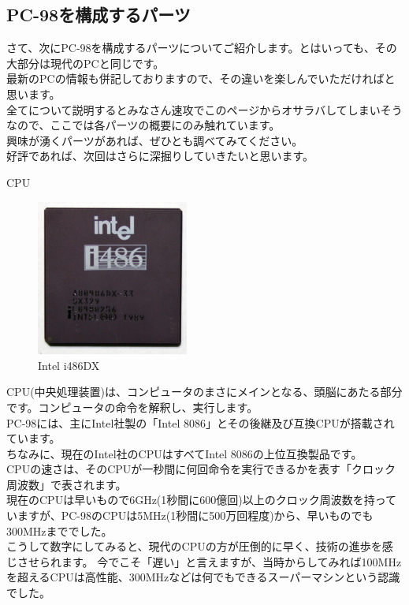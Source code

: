 \documentclass[b5paper,9pt,platex,dvipdfmx]{jsarticle}
\begin{document}
\begin{multicols*}{3}
\section[short]{PC-98を構成するパーツ}
さて、次にPC-98を構成するパーツについてご紹介します。とはいっても、その大部分は現代のPCと同じです。\\
最新のPCの情報も併記しておりますので、その違いを楽しんでいただければと思います。\\
全てについて説明するとみなさん速攻でこのページからオサラバしてしまいそうなので、ここでは各パーツの概要にのみ触れています。\\
興味が湧くパーツがあれば、ぜひとも調べてみてください。\\
好評であれば、次回はさらに深掘りしていきたいと思います。\\
\begin{enumerate}
  {\bf  \item CPU\\}
  \begin{figure}[H]
    \centering
    \includegraphics[width=5cm]{img-5.jpg}
    \caption{Intel i486DX}
  \end{figure}
CPU(中央処理装置)は、コンピュータのまさにメインとなる、頭脳にあたる部分です。コンピュータの命令を解釈し、実行します。\\
PC-98には、主にIntel社製の「Intel 8086」とその後継及び互換CPUが搭載されています。\\
ちなみに、現在のIntel社のCPUはすべてIntel 8086の上位互換製品です。\\
CPUの速さは、そのCPUが一秒間に何回命令を実行できるかを表す「クロック周波数」で表されます。\\
現在のCPUは早いもので6GHz(1秒間に600億回)以上のクロック周波数を持っていますが、PC-98のCPUは5MHz(1秒間に500万回程度)から、早いものでも300MHzまででした。\\
こうして数字にしてみると、現代のCPUの方が圧倒的に早く、技術の進歩を感じさせられます。
今でこそ「遅い」と言えますが、当時からしてみれば100MHzを超えるCPUは高性能、300MHzなどは何でもできるスーパーマシンという認識でした。\\

\end{enumerate}
\end{multicols*}
\end{document}
